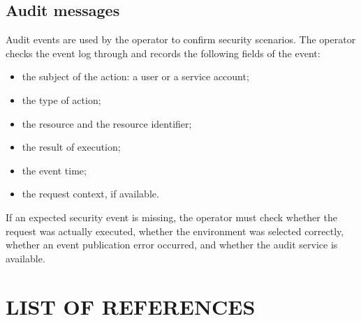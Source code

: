 \documentclass[12pt,a4paper]{extarticle}
\begin{document}
\subsection{Audit messages}

\begin{hseExample}
Audit events are used by the operator to confirm security scenarios. The operator checks the event log through  and records the following fields of the event:

\begin{itemize}[leftmargin=1.25cm]
    \item the subject of the action: a user or a service account;
    \item the type of action;
    \item the resource and the resource identifier;
    \item the result of execution;
    \item the event time;
    \item the request context, if available.
\end{itemize}

If an expected security event is missing, the operator must check whether the request was actually executed, whether the environment was selected correctly, whether an event publication error occurred, and whether the audit service is available.
\end{hseExample}

\clearpage

\pagestyle{appendix}

\section*{LIST OF REFERENCES}
\end{document}
